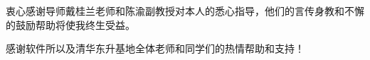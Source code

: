 
\begin{acknowledgements}
  衷心感谢导师戴桂兰老师和陈渝副教授对本人的悉心指导，他们的言传身教和不懈的鼓励帮助将使我终生受益。

  感谢软件所以及清华东升基地全体老师和同学们的热情帮助和支持！
\end{acknowledgements}
